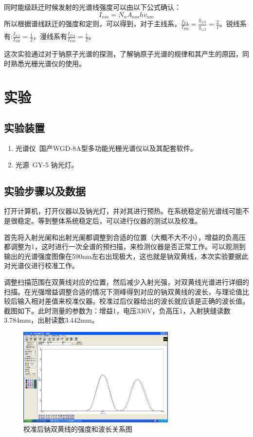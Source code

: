 \documentclass[aps,pre,12pt,preprint,onecolumn,showpacs,showkeys,UTF8]{revtex4-1}
\begin{document}
同时能级跃迁时候发射的光谱线强度可以由以下公式确认：
\begin{equation}
	I_{nm}=N_nA_{nm}hv_{nm}
\end{equation}
所以根据谱线跃迁的强度和定则，可以得到，对于主线系，$\frac{I_{PA}}{I_{PB}}=\frac{g_{3/2}}{g_{1/2}}=\frac{2}{1}$。锐线系有:$\frac{I_{SA}}{I_{SB}}=\frac{1}{2}$，漫线系有$\frac{I_{DA}}{I_{DB}}=\frac{1}{2}$。

这次实验通过对于钠原子光谱的探测，了解钠原子光谱的规律和其产生的原因，同时熟悉光栅光谱仪的使用。

\section{实验}
\subsection{实验装置}
\begin{enumerate}
	\item 光谱仪\ 国产WGD-8A型多功能光栅光谱仪以及其配套软件。
	\item 光源\ GY-5 钠光灯。
\end{enumerate}
\subsection{实验步骤以及数据}
打开计算机，打开仪器以及钠光灯，并对其进行预热。在系统稳定前光谱线可能不是很稳定。等到整体系统稳定后，可以进行仪器的测试以及校准。

首先将入射光阑和出射光阑都调整到合适的位置（大概不大不小），增益的负高压都调整为1，这时进行一次全谱的预扫描，来检测仪器是否正常工作。可以观测到输出的光谱强度图像在590nm左右出现极大，这也就是钠双黄线，本次实验要据此对光谱仪进行校准工作。

调整扫描范围在双黄线对应的位置，然后减少入射光强，对双黄线光谱进行详细的扫描。在光强增益调整合适的情况下测峰得到对应的钠双黄线的波长，与理论值比较后输入相对差值来校准仪器。校准过后仪器给出的波长就应该是正确的波长值。截图如下。此时测量的参数为：增益1，电压330V，负高压1，入射狭缝读数3.784mm，出射读数3.442mm。

\begin{figure}[h]
	\begin{center}
		\includegraphics[width=0.7\textwidth]{pic1.png}
		\caption{\label{fig:exp1}校准后钠双黄线的强度和波长关系图}
	\end{center}
\end{figure}
\end{document}
